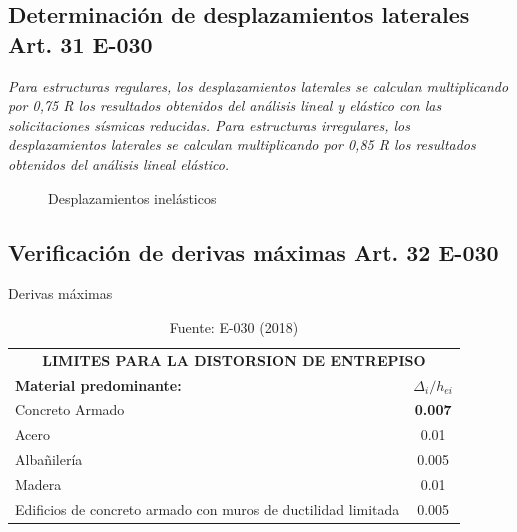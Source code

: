 \documentclass{article}%
\begin{document}
\subsection{Determinación de desplazamientos laterales Art. 31 E{-}030}%
\label{subsec:DeterminacindedesplazamientoslateralesArt.31E{-}030}%
\begin{tcolorbox}[colback=gray!5!white,colframe=Maroon!75!black,fonttitle=\bfseries,title=Art. 31.3.1]%
\textit{Para  estructuras  regulares, los  desplazamientos  laterales  se  calculan multiplicando por 0,75 R los resultados obtenidos del análisis lineal y elástico con las solicitaciones sísmicas reducidas. Para estructuras irregulares, los desplazamientos laterales se calculan multiplicando por 0,85 R los resultados obtenidos del análisis lineal elástico.}%
\end{tcolorbox}%


\begin{figure}[H]%
\caption{Desplazamientos inelásticos}%
\end{figure}

%
\subsection{Verificación de derivas máximas Art. 32 E{-}030}%
\label{subsec:VerificacindederivasmximasArt.32E{-}030}%


\begin{table}[ht!]%
\centering%
\caption{Derivas máximas}%
\begin{tabular}{|m{7cm}|c|}%
\hline%
\multicolumn{2}{|c|}{\multirow{2}[1]{*}{\textbf{LIMITES PARA LA DISTORSION DE ENTREPISO}}} \\%
\multicolumn{2}{|c|}{} \\%
\hline%
\textbf{Material predominante:} & $\Delta_{i}/h_{ei}$ \\%
\hline%
{Concreto Armado\cellcolor[rgb]{ .949,  .949,  .949} } & \textcolor[rgb]{ 1,  0,  0}{\textbf{0.007}}\cellcolor[rgb]{ .949,  .949,  .949} \\%
\hline%
{Acero} & 0.01 \\%
\hline%
{Albañilería} & 0.005 \\%
\hline%
{Madera} & 0.01 \\%
\hline%
{Edificios de concreto armado con muros de ductilidad limitada} & 0.005 \\%
\hline%
\end{tabular}%
\caption*{Fuente: E-030 (2018)}%
\end{table}
\end{document}

